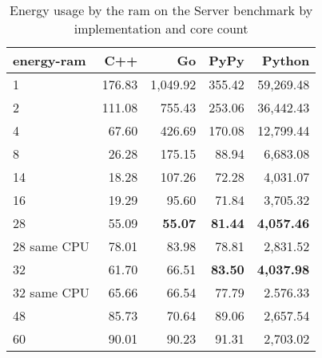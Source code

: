 \begin{table}[h]
    \centering
    \begin{tabular}{lrrrr}
        \hline
        energy-ram   & C++             & Go                & PyPy                & Python            \\
        \hline      
        1            &   176.83        & 1,049.92          &   355.42            &  59,269.48        \\
        2            &   111.08        &   755.43          &   253.06            &  36,442.43        \\
        4            &    67.60        &   426.69          &   170.08            &  12,799.44        \\
        8	         &    26.28 	   &   175.15          &    88.94            &	  6,683.08       \\
        14           &    18.28        &   107.26          &    72.28            &   4,031.07        \\
        16           &    19.29        &    95.60          &    71.84            &   3,705.32        \\
        28           & 55.09           &    \textbf{55.07} &    \textbf{81.44}   & \textbf{4,057.46} \\
        28 same CPU  & 78.01           &    83.98          &    78.81            &   2,831.52        \\
        32           & 61.70           &    66.51          &    \textbf{83.50}   & \textbf{4,037.98} \\
        32 same CPU  & 65.66           &    66.54          &    77.79            &   2.576.33        \\
        48           & 85.73           &    70.64          &    89.06            &   2,657.54        \\
        60           & 90.01           &    90.23          &    91.31            &   2,703.02        \\
        \hline
    \end{tabular}
\caption[Server - \gls{ram} energy consumption]{Energy usage by the \gls{ram} on the Server benchmark by implementation and core count}
\label{tab:server-energy-ram}
\end{table}

